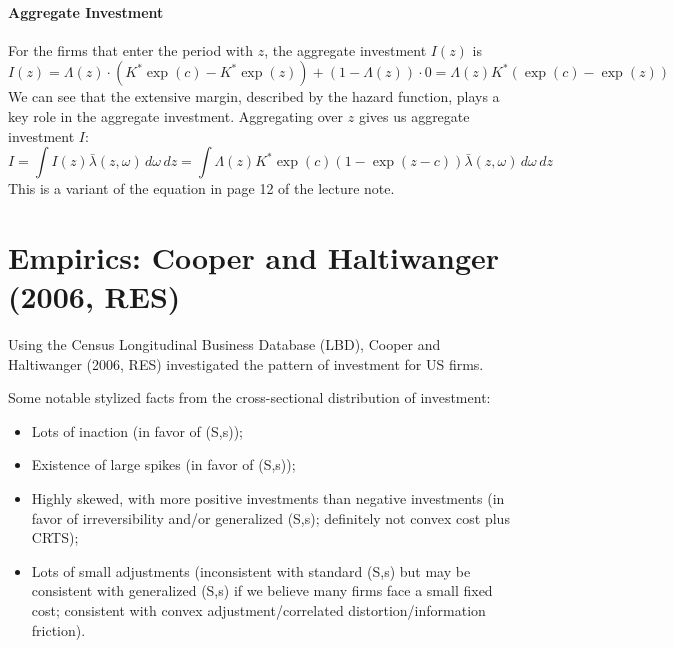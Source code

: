 \documentclass[12pt]{article}
\begin{document}
\paragraph{Aggregate Investment \\ [6pt]}

For the firms that enter the period with $z$, the aggregate investment $I(z)$ is 
\begin{equation}
	I(z) = \Lambda(z) \cdot (K^* \exp(c) - K^*\exp(z)) + (1-\Lambda(z)) \cdot 0 = \Lambda(z) K^* (\exp(c) - \exp(z))
\end{equation}
We can see that the extensive margin, described by the hazard function, plays a key role in the aggregate investment. Aggregating over $z$ gives us aggregate investment $I$:
\begin{equation}
	I = \int I(z) \bar{\lambda}(z, \omega) \,d\omega \, dz = \int \Lambda(z) K^* \exp(c) (1- \exp(z - c)) \bar{\lambda}(z, \omega) \, d\omega \, dz
\end{equation}
This is a variant of the equation in page 12 of the lecture note.

\section{Empirics: Cooper and Haltiwanger (2006, RES)}

Using the Census Longitudinal Business Database (LBD), Cooper and Haltiwanger (2006, RES) investigated the pattern of investment for US firms. 

Some notable stylized facts from the cross-sectional distribution of investment:
\begin{itemize}
	\item Lots of inaction (in favor of (S,s));
	\item Existence of large spikes (in favor of (S,s));
		\item Highly skewed, with more positive investments than negative investments (in favor of irreversibility and/or generalized (S,s); definitely not convex cost plus CRTS);
	\item Lots of small adjustments (inconsistent with standard (S,s) but may be consistent with generalized (S,s) if we believe many firms face a small fixed cost; consistent with convex adjustment/correlated distortion/information friction). 
\end{itemize}
\end{document}
